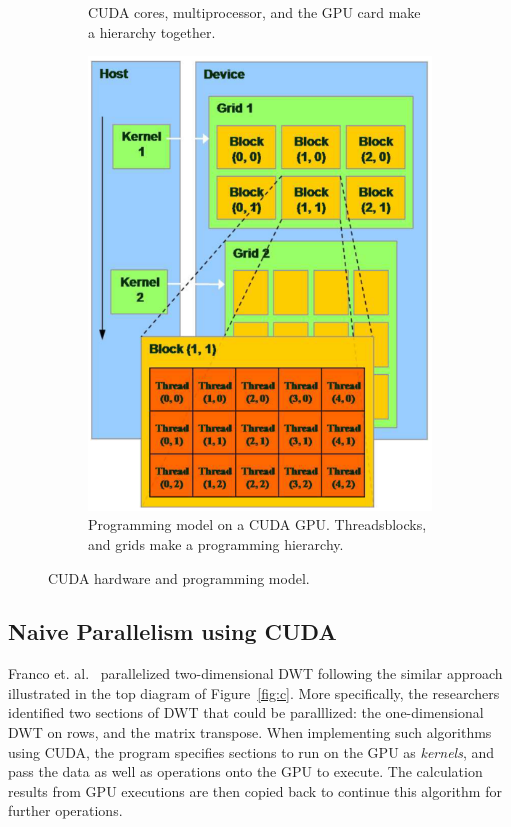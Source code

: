 \begin{figure}
\begin{subfigure}[b]{0.46\textwidth}
{                CUDA cores, multiprocessor, and the GPU card
                make a hierarchy together.}
                \label{fig:cuda-hw}
        \end{subfigure}
\quad
    \begin{subfigure}[b]{0.42\textwidth}
        \includegraphics[width=\textwidth]{fig/cuda-pro.png}
        \caption{Programming model on a CUDA GPU.
                 Threadsblocks, and grids make a programming 
                 hierarchy.}
        \label{fig:cuda-pro}
    \end{subfigure}
%
    \caption{CUDA hardware and programming model.}
\end{figure}



\subsection{Naive Parallelism using CUDA}
\label{sec:cuda-naive}
%
Franco et. al.~\cite{franco2009parallel} parallelized two-dimensional 
DWT following the similar approach
illustrated in the top diagram of Figure~\ref{fig:c}.
%
More specifically, the researchers identified two sections of DWT
that could be paralllized: the one-dimensional DWT on rows, and the
matrix transpose.
%
When implementing such algorithms using CUDA, the program specifies
sections to run on the GPU as \textit{kernels}, and pass the data 
as well as operations onto the GPU to execute.
%
The calculation results from GPU executions are then copied back
to continue this algorithm for further operations.

